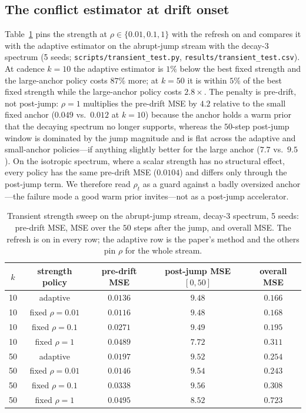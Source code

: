 \subsection{The conflict estimator at drift onset}
\label{app:transient}

Table~\ref{tab:transient} pins the strength at $\rho \in \{0.01, 0.1, 1\}$ with the refresh on and compares it with the adaptive estimator on the abrupt-jump stream with the decay-3 spectrum (5 seeds; \texttt{scripts/transient\_test.py}, \texttt{results/transient\_test.csv}).
At cadence $k = 10$ the adaptive estimator is $1\%$ below the best fixed strength and the large-anchor policy costs $87\%$ more; at $k = 50$ it is within $5\%$ of the best fixed strength while the large-anchor policy costs $2.8\times$.
The penalty is pre-drift, not post-jump: $\rho = 1$ multiplies the pre-drift MSE by $4.2$ relative to the small fixed anchor ($0.049$ vs.\ $0.012$ at $k = 10$) because the anchor holds a warm prior that the decaying spectrum no longer supports, whereas the $50$-step post-jump window is dominated by the jump magnitude and is flat across the adaptive and small-anchor policies---if anything slightly better for the large anchor ($7.7$ vs.\ $9.5$).
On the isotropic spectrum, where a scalar strength has no structural effect, every policy has the same pre-drift MSE ($0.0104$) and differs only through the post-jump term.
We therefore read $\rho_t$ as a guard against a badly oversized anchor---the failure mode a good warm prior invites---not as a post-jump accelerator.

\begin{table}[!htbp]
\centering
\footnotesize
\caption{Transient strength sweep on the abrupt-jump stream, decay-3 spectrum, 5 seeds: pre-drift MSE, MSE over the $50$ steps after the jump, and overall MSE.
The refresh is on in every row; the adaptive row is the paper's method and the others pin $\rho$ for the whole stream.}
\label{tab:transient}
\begin{tabular}{ccccc}
\toprule
$k$ & strength policy & pre-drift MSE & post-jump MSE $[0,50]$ & overall MSE \\
\midrule
10 & adaptive & $0.0136$ & $9.48$ & $\mathbf{0.166}$ \\
10 & fixed $\rho = 0.01$ & $0.0116$ & $9.48$ & $0.168$ \\
10 & fixed $\rho = 0.1$ & $0.0271$ & $9.49$ & $0.195$ \\
10 & fixed $\rho = 1$ & $0.0489$ & $7.72$ & $0.311$ \\
\midrule
50 & adaptive & $0.0197$ & $9.52$ & $0.254$ \\
50 & fixed $\rho = 0.01$ & $0.0146$ & $9.54$ & $\mathbf{0.243}$ \\
50 & fixed $\rho = 0.1$ & $0.0338$ & $9.56$ & $0.308$ \\
50 & fixed $\rho = 1$ & $0.0495$ & $8.52$ & $0.723$ \\
\bottomrule
\end{tabular}
\end{table}

